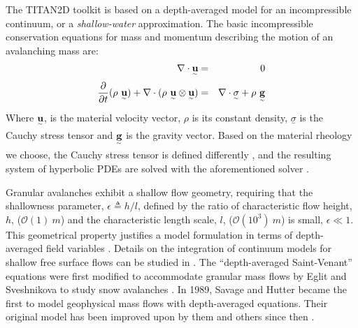 The TITAN2D toolkit is based on a depth-averaged model for an incompressible continuum, or a \emph{shallow-water} approximation. The basic incompressible conservation equations for mass and momentum describing the motion of an avalanching mass are:
\begin{eqnarray}
\label{eq:N_S}
\nabla \cdot \underset{^\sim}{\textbf u} &=& 0 \nonumber \\
\frac{\partial}{\partial t}(\rho \ \underset{^\sim}{\textbf u})+\nabla \cdot (\rho \ \underset{^\sim}{\textbf u}\otimes\underset{^\sim}{\textbf u}) &=& \nabla \cdot \underset{^\sim}{\sigma}+\rho \ \underset{^\sim}{\textbf g}
\end{eqnarray}
Where $\underset{^\sim}{\textbf u}$, is the material velocity vector, $\rho$ is its constant density, $\underset{^\sim}{\sigma}$ is the Cauchy stress tensor and  $\underset{^\sim}{\textbf g}$ is the gravity vector. Based on the material rheology we choose, the Cauchy stress tensor is defined differently \cite{FreundtBursik1998}, and the resulting system of hyperbolic PDEs are solved with the aforementioned solver \cite{Patra2005}.

%






Granular avalanches exhibit a shallow flow geometry, requiring that the shallowness parameter, $\epsilon\triangleq h/l$, defined by the ratio of characteristic flow height, $h$, ($\mathcal{O}(1) \ m$) and the characteristic length scale, $l$, ($\mathcal{O}(10^3) \ m $) is small, $\epsilon \ll 1$. This geometrical property justifies a model formulation in terms of depth-averaged field variables \cite{SavageHutter,Bartelt1999}. Details on the integration of continuum models for shallow free surface flows can be studied in \cite{SavageHutter,PudasainiHutter2007}. The ``depth-averaged Saint-Venant'' equations were first modified to accommodate granular mass
flows by Eglit and Sveshnikova to study snow avalanches \cite{eglit1980mms}. In 1989, Savage and Hutter \cite{SavageHutter} became the first to model geophysical mass flows with depth-averaged equations. Their original model has been improved upon by them and others since then \cite{Hutter1993,Iverson1997,Gray1999,Iverson2001,PudasainiHutter2003,SavageIverson2003}.


